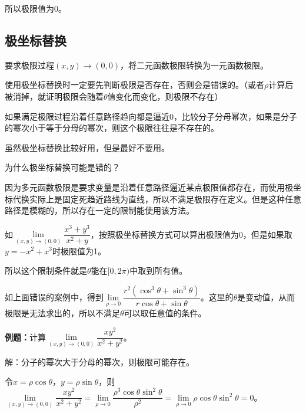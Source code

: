\documentclass[UTF8, 12pt]{ctexart}
\begin{document}
所以极限值为0。

\subsection{极坐标替换}

要求极限过程$(x,y)\to(0,0)$，将二元函数极限转换为一元函数极限。

使用极坐标替换时一定要先判断极限是否存在，否则会是错误的。（或者$\rho$计算后被消掉，就证明极限会随着$\theta$值变化而变化，则极限不存在）

如果满足极限过程沿着任意路径趋向都是逼近0，比较分子分母幂次，如果是分子的幂次小于等于分母的幂次，则这个极限往往是不存在的。

虽然极坐标替换比较好用，但是最好不要用。

为什么极坐标替换可能是错的？

因为多元函数极限是要求变量是沿着任意路径逼近某点极限值都存在，而使用极坐标代换实际上是固定死趋近路线为直线，所以不满足极限存在定义。但是这种任意路径是模糊的，所以存在一定的限制能使用该方法。

如$\lim\limits_{(x,y)\to(0,0)}\dfrac{x^3+y^3}{x^2+y}$，按照极坐标替换方式可以算出极限值为0，但是如果取$y=-x^2+x^3$时极限值为1。

所以这个限制条件就是$\theta$能在$[0,2\pi)$中取到所有值。

如上面错误的案例中，得到$\lim\limits_{\rho\to0}\dfrac{r^2(\cos^3\theta+\sin^3\theta)}{r\cos\theta+\sin\theta}$。这里的$\theta$是变动值，从而极限是无法求出的，所以不满足$\theta$可以取任意值的条件。





\textbf{例题：}计算$\lim\limits_{(x,y)\to(0,0)}\dfrac{xy^2}{x^2+y^2}$。

解：分子的幂次大于分母的幂次，则极限可能存在。

令$x=\rho\cos\theta$，$y=\rho\sin\theta$，则$\lim\limits_{(x,y)\to(0,0)}\dfrac{xy^2}{x^2+y^2}=\lim\limits_{\rho\to0}\dfrac{\rho^3\cos\theta\sin^2\theta}{\rho^2}=\lim\limits_{\rho\to0}\rho\cos\theta\sin^2\theta=0$。
\end{document}
